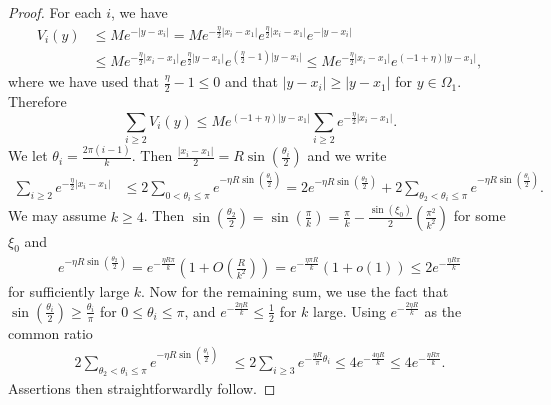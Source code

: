 \documentclass{amsart}
\theoremstyle{definition}
\theoremstyle{remark}
\numberwithin{equation}{section}
\begin{document}
\begin{proof}
For each $i$, we have
\begin{align*}
 V_i(y) &\le M e^{-|y-x_i|} = Me^{ -\frac{\eta}{2}|x_i-x_1| }e^{ \frac{\eta}{2}|x_i-x_1| }e^{ -|y-x_i| }\\&
 \le Me^{ -\frac{\eta}{2}|x_i-x_1| }e^{ \frac{\eta}{2}|y-x_1| }e^{ ( \frac{\eta}{2}-1)|y-x_i| }
\le Me^{ -\frac{\eta}{2}|x_i-x_1| }e^{ ( -1 + \eta)|y-x_1| }, 
\end{align*}
where we have used that $ \frac{\eta}{2} -1 \le 0$ and that $|y-x_i|\ge |y-x_1|$ for $y\in \Omega_1$. Therefore
$$\sum_{i\ge 2} V_{i}(y) \le Me^{(-1+\eta)|y-x_1|}\sum_{i\ge 2} e^{-\frac{\eta}{2}|x_i-x_1|}.$$
We let $\theta_i = \frac{2\pi(i-1)}{k}$. Then $ \frac{|x_i-x_1|}{2} = R\sin\left(\frac{\theta_i}{2}\right)$ and we write
\begin{align}\label{sum2}
 \sum_{i\ge 2} e^{-\frac{\eta}{2}|x_i-x_1|} &\le 2\sum_{0<\theta_i \le \pi} e^{-\eta R\sin\left(\frac{\theta_i}{2}\right)} = 2 e^{-\eta R\sin\left(\frac{\theta_2}{2}\right)} + 2\sum_{\theta_2 <\theta_i \le \pi}e^{-\eta R\sin\left(\frac{\theta_i}{2}\right)} .%
\end{align}
We may assume $k \ge 4$. Then $\sin\left(\frac{\theta_2}{2}\right) = \sin \left(\frac{\pi}{k}\right) = \frac{\pi}{k} - \frac{\sin(\xi_0)}{2}(\frac{\pi^2}{k^2})$ for some $\xi_0$ and
\begin{align*}
 e^{-\eta R\sin\left(\frac{\theta_2}{2}\right)} = e^{-\frac{\eta R \pi }{k}} \left(1 + O\left(\frac{R}{k^2}\right) \right)  = e^{-\frac{\eta \pi R}{k}} (1 + o(1)) \le 2 e^{-\frac{\eta  R\pi}{k}}
\end{align*}
for sufficiently large $k$. Now for the remaining sum, we use the fact that $ \sin\left(\frac{\theta_i}{2}\right) \ge \frac{\theta_i}{\pi}$ for $0\le\theta_i \le \pi$, and $e^{-\frac{2\eta R}{k}} \le \frac{1}{2}$ for $k$ large. Using $e^{-\frac{2\eta R}{k}}$ as the common ratio 
\begin{align}\label{sum3}
 2\sum_{{\theta_2 <\theta_i \le \pi}} e^{-\eta R\sin\left(\frac{\theta_i}{2}\right)} &\le 2\sum_{i\ge 3} e^{-\frac{\eta R}{\pi}\theta_i} \le 4 e^{-\frac{4\eta R}{k}} \le 4e^{-\frac{\eta R \pi }{k}}.
\end{align}
Assertions then straightforwardly follow.
 \end{proof}
\end{document}
